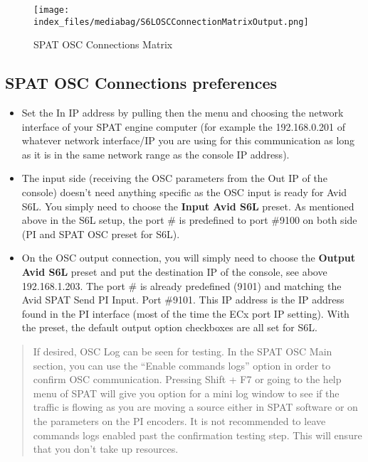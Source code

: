 \documentclass[
  letterpaper,
  DIV=11,
  numbers=noendperiod]{scrreport}
\begin{document}
\begin{figure}

{\centering \texttt{[image: index\_files/mediabag/S6LOSCConnectionMatrixOutput.png]}

}

\caption{SPAT OSC Connections Matrix}

\end{figure}

\hypertarget{spat-osc-connections-preferences}{%
\subsection{SPAT OSC Connections
preferences}\label{spat-osc-connections-preferences}}

\begin{itemize}
\item
  Set the In IP address by pulling then the menu and choosing the
  network interface of your SPAT engine computer (for example the
  192.168.0.201 of whatever network interface/IP you are using for this
  communication as long as it is in the same network range as the
  console IP address).
\item
  The input side (receiving the OSC parameters from the Out IP of the
  console) doesn't need anything specific as the OSC input is ready for
  Avid S6L. You simply need to choose the \textbf{Input \textbar{} Avid
  S6L} preset. As mentioned above in the S6L setup, the port \# is
  predefined to port \#9100 on both side (PI and SPAT OSC preset for
  S6L).
\item
  On the OSC output connection, you will simply need to choose the
  \textbf{Output \textbar{} Avid S6L} preset and put the destination IP
  of the console, see above 192.168.1.203. The port \# is already
  predefined (9101) and matching the Avid SPAT Send PI Input. Port
  \#9101. This IP address is the IP address found in the PI interface
  (most of the time the ECx port IP setting). With the preset, the
  default output option checkboxes are all set for S6L.
\end{itemize}

\begin{quote}
If desired, OSC Log can be seen for testing. In the SPAT OSC Main
section, you can use the ``Enable commands logs'' option in order to
confirm OSC communication. Pressing Shift + F7 or going to the help menu
of SPAT will give you option for a mini log window to see if the traffic
is flowing as you are moving a source either in SPAT software or on the
parameters on the PI encoders. It is not recommended to leave commands
logs enabled past the confirmation testing step. This will ensure that
you don't take up resources.
\end{quote}
\end{document}
